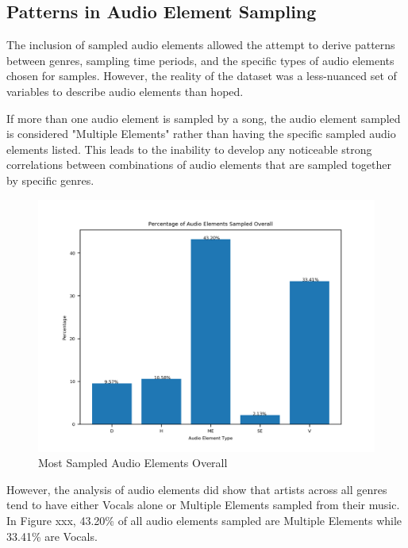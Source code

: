 \documentclass[pageno]{jpaper}
\begin{document}
\subsection{Patterns in Audio Element Sampling}
The inclusion of sampled audio elements allowed the attempt to derive patterns between genres, sampling time periods, and the specific types of audio elements chosen for samples. However, the reality of the dataset was a less-nuanced set of variables to describe audio elements than hoped.

If more than one audio element is sampled by a song, the audio element sampled is considered "Multiple Elements" rather than having the specific sampled audio elements listed. This leads to the inability to develop any noticeable strong correlations between combinations of audio elements that are sampled together by specific genres.
\begin{figure}[H]
\includegraphics{audioElemSampledOverall}
\caption{Most Sampled Audio Elements Overall}
\centering
\end{figure}
However, the analysis of audio elements did show that artists across all genres tend to have either Vocals alone or Multiple Elements sampled from their music. In Figure xxx, 43.20\% of all audio elements sampled are Multiple Elements while 33.41\% are Vocals. 
\end{document}
